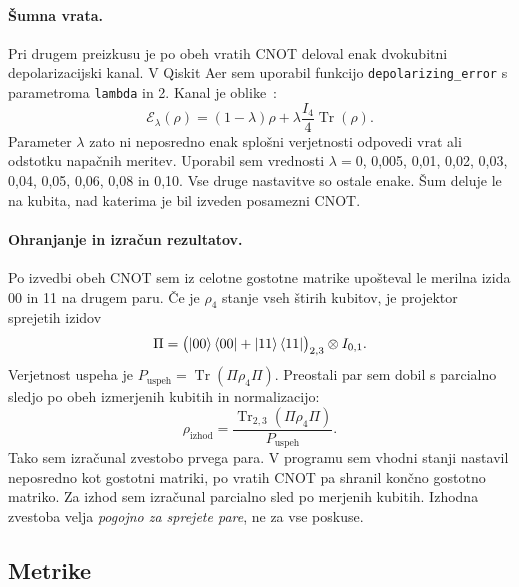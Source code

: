 \paragraph{Šumna vrata.}
Pri drugem preizkusu je po obeh vratih CNOT deloval enak dvokubitni depolarizacijski kanal. V Qiskit Aer sem uporabil funkcijo \texttt{depolarizing\_error} s parametroma \texttt{lambda} in 2. Kanal je oblike~\cite{g24:qiskit_aer_docs}:
\begin{equation}
 \mathcal{E}_{\lambda}(\rho)=(1-\lambda)\rho
  +\lambda\frac{I_4}{4}\operatorname{Tr}(\rho).
 \label{g24:eq:depolar}
\end{equation}
Parameter $\lambda$ zato ni neposredno enak splošni verjetnosti odpovedi vrat ali odstotku napačnih meritev. Uporabil sem vrednosti $\lambda=0$, 0,005, 0,01, 0,02, 0,03, 0,04, 0,05, 0,06, 0,08 in 0,10. Vse druge nastavitve so ostale enake. Šum deluje le na kubita, nad katerima je bil izveden posamezni CNOT.

\paragraph{Ohranjanje in izračun rezultatov.}
Po izvedbi obeh CNOT sem iz celotne gostotne matrike upošteval le merilna izida 00 in 11 na drugem paru. Če je $\rho_4$ stanje vseh štirih kubitov, je projektor sprejetih izidov
\begin{equation}
\Pi=\bigl(\ket{00}\bra{00}+\ket{11}\bra{11}\bigr)_{2,3}
\otimes I_{0,1}.
\label{g24:eq:projektor}
\end{equation}
Verjetnost uspeha je $P_{\mathrm{uspeh}}=\operatorname{Tr}(\Pi\rho_4\Pi)$. Preostali par sem dobil s parcialno sledjo po obeh izmerjenih kubitih in normalizacijo:
\begin{equation}
\rho_{\mathrm{izhod}}=\frac{\operatorname{Tr}_{2,3}(\Pi\rho_4\Pi)}{P_{\mathrm{uspeh}}}.
\label{g24:eq:postselekcija}
\end{equation}
Tako sem izračunal zvestobo prvega para. V programu sem vhodni stanji nastavil neposredno kot gostotni matriki, po vratih CNOT pa shranil končno gostotno matriko. Za izhod sem izračunal parcialno sled po merjenih kubitih. Izhodna zvestoba velja \emph{pogojno za sprejete pare}, ne za vse poskuse.
\subsection{Metrike}
\label{g24:sec:metrike}

